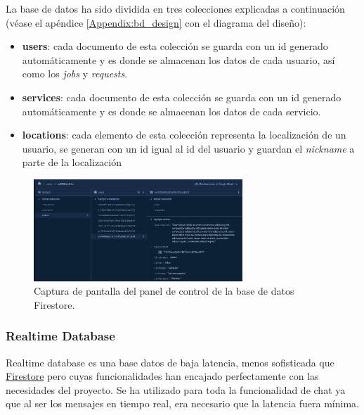 La base de datos ha sido dividida en tres colecciones explicadas a continuación (véase el apéndice \ref{Appendix:bd_design} con el diagrama del diseño):
\begin{itemize}
    \item \textbf{users}: cada documento de esta colección se guarda con un id generado automáticamente y es donde se almacenan los datos de cada usuario, así como los \textit{jobs} y \textit{requests}.
    \item \textbf{services}: cada documento de esta colección se guarda con un id generado automáticamente y es donde se almacenan los datos de cada servicio.
    \item \textbf{locations}: cada elemento de esta colección representa la localización de un usuario, se generan con un id igual al id del usuario y guardan el \textit{nickname} a parte de la localización
\end{itemize}
\begin{figure}[h]
    \centering
    \includegraphics[width = 0.7\textwidth]{Imagenes/Fuentes/ejemplo_firestore.png}
    \caption{Captura de pantalla del panel de control de la base de datos Firestore.}
    \label{fig:ejemplo_firestore}
\end{figure}
\hypertarget{subsec:realtime}{}
\subsubsection{Realtime Database}
Realtime database\hyperlink{cap:biblio}{} es una base datos de baja latencia, menos sofisticada que \hyperlink{subsec:firestore}{Firestore} pero cuyas funcionalidades han encajado perfectamente con las necesidades del proyecto. Se ha utilizado para toda la funcionalidad de chat ya que al ser los mensajes en tiempo real, era necesario que la latencia fuera mínima. 


